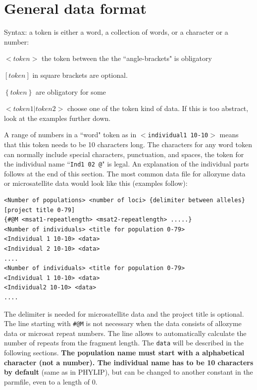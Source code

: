 \section*{General data format}
Syntax: a token is either a word, a collection of words, or a character or a number:
\begin{description}
\item{$<token>$} the token between the the ``angle-brackets" is obligatory
\item{$\left[token\right]$} in square brackets are optional.
\item{$\left\{token\right\}$} are obligatory for some 
\item{$<token1 | token2>$} choose one of the token kind of data.
If this is too abstract, look at the examples further down.
\end{description}
A range of numbers in a ``word" token as in $<${\tt individual1 10-10}$>$
means that this token needs to be 10 characters long. The characters for
any word token can normally include special characters, punctuation, and spaces, the token for the individual name ``{\tt Ind1  02 @}" is legal. An explanation of the individual parts follows at the end of this section.
The most common data file for allozyme data or microsatellite data
would look like this (examples follow):
\smallskip
\begin{small}
\begin{tt}
\begin{verbatim}
<Number of populations> <number of loci> {delimiter between alleles} [project title 0-79]
{#@M <msat1-repeatlength> <msat2-repeatlength> .....}
<Number of individuals> <title for population 0-79>
<Individual 1 10-10> <data>
<Individual 2 10-10> <data>
....
<Number of individuals> <title for population 0-79>
<Individual 1 10-10> <data>
<Individual2 10-10> <data>
....
\end{verbatim}
\end{tt}
\end{small}
The delimiter is needed for microsatellite data and the project title is optional.  The line starting with {\tt \#@M}  is not necessary when the data consists of allozyme data or microsat repeat numbers. The line allows to automatically calculate the number of repeats from the fragment length.   The {\tt data}
will be described in the following sections. \textbf{The population name must start with a alphabetical character (not a number). The individual name has to be  10 characters by default} (same as in PHYLIP), but can be changed to another constant in the parmfile, even to a length of 0.
